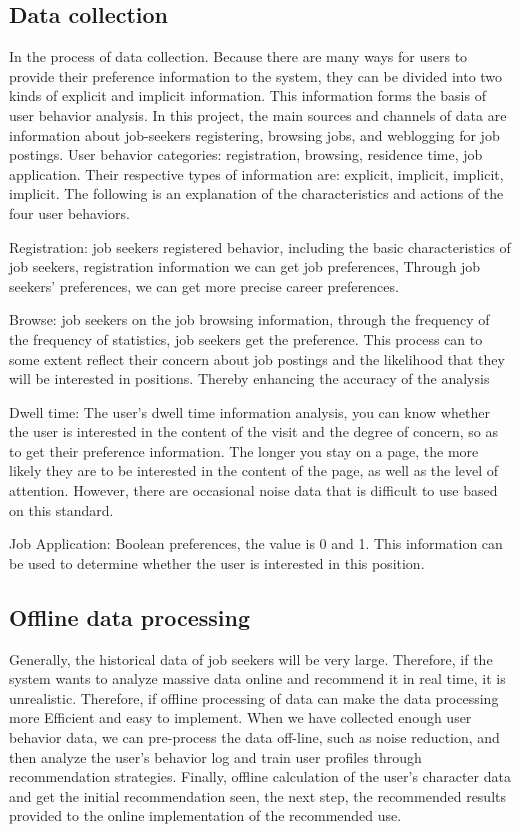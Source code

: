 \documentclass[sigconf]{acmart}
\begin{document}
\subsection{Data collection}
In the process of data collection. Because there are many ways for users to provide their preference information to the system, they can be divided into two kinds of explicit and implicit information. This information forms the basis of user behavior analysis. In this project, the main sources and channels of data are information about job-seekers registering, browsing jobs, and weblogging for job postings. User behavior categories: registration, browsing, residence time, job application. Their respective types of information are: explicit, implicit, implicit, implicit. The following is an explanation of the characteristics and actions of the four user behaviors.
\par Registration: job seekers registered behavior, including the basic characteristics of job seekers, registration information we can get job preferences,
Through job seekers' preferences, we can get more precise career preferences.
\par Browse: job seekers on the job browsing information, through the frequency of the frequency of statistics, job seekers get the preference. This process can to some extent reflect their concern about job postings and the likelihood that they will be interested in positions. Thereby enhancing the accuracy of the analysis
\par Dwell time: The user's dwell time information analysis, you can know whether the user is interested in the content of the visit and the degree of concern, so as to get their preference information. The longer you stay on a page, the more likely they are to be interested in the content of the page, as well as the level of attention. However, there are occasional noise data that is difficult to use based on this standard.
\par Job Application: Boolean preferences, the value is 0 and 1. This information can be used to determine whether the user is interested in this position.

\subsection{Offline data processing}
Generally, the historical data of job seekers will be very large. Therefore, if the system wants to analyze massive data online and recommend it in real time, it is unrealistic. Therefore, if offline processing of data can make the data processing more Efficient and easy to implement. When we have collected enough user behavior data, we can pre-process the data off-line, such as noise reduction, and then analyze the user's behavior log and train user profiles through recommendation strategies. Finally, offline calculation of the user's character data and get the initial recommendation seen, the next step, the recommended results provided to the online implementation of the recommended use.
\end{document}
